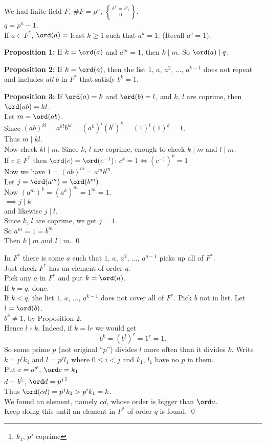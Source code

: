 We had finite field $F$, $\#F=p^n$, $F^*=F\setminus\brace0$. \\
$q=p^n-1$. \\
If $a\in F^*$, $\ord(a)={}$least $k\geq1$ such that $a^k=1$.  (Recall $a^q=1$).

\textbf{Proposition 1:} If $k=\ord(a)$ and $a^m=1$, then $k\mid m$.  So $\ord(a)\mid q$.

\textbf{Proposition 2:} If $k=\ord(a)$, then the list $1$, $a$, $a^2$, $\dotsc$, $a^{k-1}$ does not repeat and includes \emph{all} $b$ in $F^*$ that satisfy $b^k=1$.

\textbf{Proposition 3:} If $\ord(a)=k$ and $\ord(b)=l$, and $k$, $l$ are coprime, then $\ord(ab)=kl$. \\
\pf Let $m=\ord(ab)$. \\
Since $(ab)^{kl}=a^{kl}b^{kl}=(a^k)^l(b^l)^k=(1)^l(1)^k=1$. \\
Thus $m\mid kl$. \\
Now check $kl\mid m$.  Since $k$, $l$ are coprime, enough to check $k\mid m$ and $l\mid m$. \\
\aside If $c\in F^*$ then $\ord(c)=\ord(c^{-1})$: $c^k=1\iff(c^{-1})^k=1$ \\
Now we have $1=(ab)^m=a^m b^m$. \\
Let $j=\ord(a^m)=\ord(b^m)$. \\
Now $(a^m)^k=(a^k)^m=1^m=1$. \\
$\implies j\mid k$ \\
and likewise $j\mid l$. \\
Since $k$, $l$ are coprime, we get $j=1$. \\
So $a^m=1=b^m$ \\
Then $k\mid m$ and $l\mid m$. \qed

\thm In $F^*$ there is some $a$ such that $1$, $a$, $a^2$, $\dotsc$, $a^{q-1}$ picks up all of $F^*$. \\
\pf Just check $F^*$ has an element of order $q$. \\
Pick any $a$ in $F^*$ and put $k=\ord(a)$. \\
If $k=q$, done. \\
If $k<q$, the list $1$, $a$, $\dotsc$, $a^{k-1}$ does not cover all of $F^*$.  Pick $b$ not in list.  Let $l=\ord(b)$. \\
\note $b^k\neq1$, by Proposition 2. \\
Hence $l\nmid k$.  Indeed, if $k=lr$ we would get
\[ b^k = (b^l)^r = 1^r = 1 . \]
So some prime $p$ (not original ``$p$'') divides $l$ more often than it divides $k$.  Write $k=p^i k_1$ and $l=p^j l_1$ where $0\leq i<j$ and $k_1$, $l_1$ have no $p$ in them. \\
Put $c=a^{p^i}$, $\ord c=k_1$ \\
\phantom{Put }$d=b^{l_1}$, $\ord d=p^j$\footnote{$k_1$, $p^j$ coprime} \\
Thus $\ord(cd)=p^j k_1>p^i k_1=k$. \\
We found an element, namely $cd$, whose order is bigger than $\ord a$. \\
Keep doing this until an element in $F^*$ of order $q$ is found. \qed

